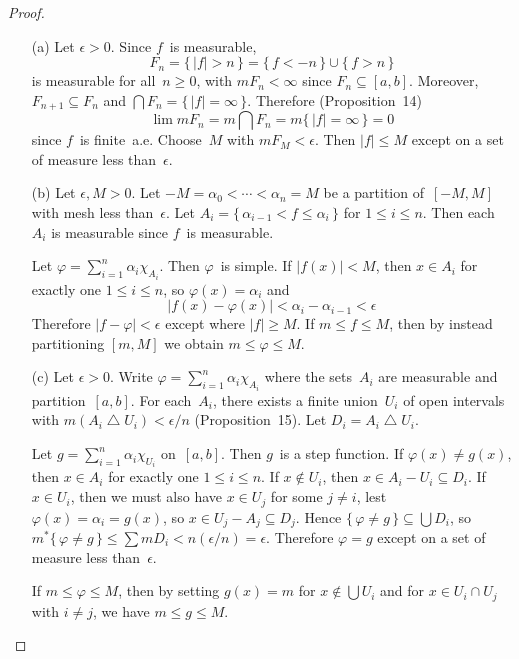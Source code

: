 \documentclass[letterpaper,12pt]{article}
\newcommand{\union}{\cup}
\newcommand{\sect}{\cap}
\newcommand{\diff}{\bigtriangleup}
\newcommand{\bigunion}{\bigcup}
\newcommand{\bigsect}{\bigcap}
\newcommand{\mo}{m^*}
\newcommand{\m}{m}
\newcommand{\abs}[1]{|{#1}|}
\newcommand{\chr}[1]{\chi_{#1}}
\theoremstyle{plain}
\theoremstyle{definition}
\theoremstyle{remark}
\begin{document}
\begin{proof}\ 
\begin{enumerate}
\item[(a)] Let \(\epsilon>0\). Since \(f\)~is measurable,
\[F_n=\{\,\abs{f}>n\,\}=\{\,f<-n\,\}\union\{\,f>n\,\}\]
is measurable for all~\(n\ge0\), with \(\m F_n<\infty\) since \(F_n\subseteq[a,b]\). Moreover, \(F_{n+1}\subseteq F_n\) and \(\bigsect F_n=\{\,\abs{f}=\infty\,\}\). Therefore (Proposition~14)
\[\lim\m F_n=\m\bigsect F_n=\m\{\,\abs{f}=\infty\,\}=0\]
since \(f\)~is finite~a.e. Choose~\(M\) with \(\m F_M<\epsilon\). Then \(\abs{f}\le M\) except on a set of measure less than~\(\epsilon\).

\item[(b)] Let \(\epsilon,M>0\). Let \(-M=\alpha_0<\cdots<\alpha_n=M\) be a partition of~\([-M,M]\) with mesh less than~\(\epsilon\). Let \(A_i=\{\,\alpha_{i-1}<f\le\alpha_i\,\}\) for \(1\le i\le n\). Then each~\(A_i\) is measurable since \(f\)~is measurable.

Let \(\varphi=\sum_{i=1}^n\alpha_i\chr{A_i}\). Then \(\varphi\)~is simple. If \(\abs{f(x)}<M\), then \(x\in A_i\) for exactly one \(1\le i\le n\), so \(\varphi(x)=\alpha_i\) and
\[\abs{f(x)-\varphi(x)}<\alpha_i-\alpha_{i-1}<\epsilon\]
Therefore \(\abs{f-\varphi}<\epsilon\) except where \(\abs{f}\ge M\). If \(m\le f\le M\), then by instead partitioning \([m,M]\) we obtain \(m\le\varphi\le M\).

\item[(c)] Let \(\epsilon>0\). Write \(\varphi=\sum_{i=1}^n\alpha_i\chr{A_i}\) where the sets~\(A_i\) are measurable and partition~\([a,b]\). For each~\(A_i\), there exists a finite union~\(U_i\) of open intervals with \(\m(A_i\diff U_i)<\epsilon/n\) (Proposition~15). Let \(D_i=A_i\diff U_i\).

Let \(g=\sum_{i=1}^n\alpha_i\chr{U_i}\) on~\([a,b]\). Then \(g\)~is a step function. If \(\varphi(x)\ne g(x)\), then \(x\in A_i\) for exactly one \(1\le i\le n\). If \(x\not\in U_i\), then \(x\in A_i-U_i\subseteq D_i\). If \(x\in U_i\), then we must also have \(x\in U_j\) for some \(j\ne i\), lest \(\varphi(x)=\alpha_i=g(x)\), so \(x\in U_j-A_j\subseteq D_j\). Hence \(\{\,\varphi\ne g\,\}\subseteq\bigunion D_i\), so \(\mo\{\,\varphi\ne g\,\}\le\sum\m D_i<n(\epsilon/n)=\epsilon\). Therefore \(\varphi=g\) except on a set of measure less than~\(\epsilon\).

If \(m\le\varphi\le M\), then by setting \(g(x)=m\) for \(x\not\in\bigunion U_i\) and for \(x\in U_i\sect U_j\) with \(i\ne j\), we have \(m\le g\le M\).


\end{enumerate}
\end{proof}
\end{document}
